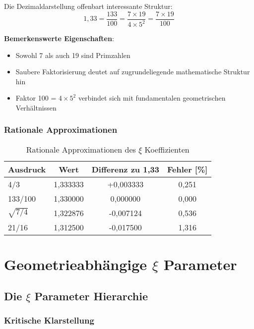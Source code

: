 \documentclass[12pt,a4paper]{article}
\newcommand{\mytimes}{\ensuremath{\times}}
\begin{document}
	Die Dezimaldarstellung offenbart interessante Struktur:
	\begin{equation}
		1,33 = \frac{133}{100} = \frac{7 \mytimes 19}{4 \mytimes 5^2} = \frac{7 \mytimes 19}{100}
		\label{eq:faktorisierung}
	\end{equation}
	
	\textbf{Bemerkenswerte Eigenschaften}:
	\begin{itemize}
		\item Sowohl 7 als auch 19 sind Primzahlen
		\item Saubere Faktorisierung deutet auf zugrundeliegende mathematische Struktur hin
		\item Faktor 100 = $4 \mytimes 5^2$ verbindet sich mit fundamentalen geometrischen Verhältnissen
	\end{itemize}
	
	\subsubsection{Rationale Approximationen}
	\label{subsubsec:rationale_approximationen}
	
	\begin{table}[htbp]
		\centering
		\begin{tabular}{lccc}
			\toprule
			\textbf{Ausdruck} & \textbf{Wert} & \textbf{Differenz zu 1,33} & \textbf{Fehler [\%]} \\
			\midrule
			4/3 & 1,333333 & +0,003333 & 0,251 \\
			133/100 & 1,330000 & 0,000000 & 0,000 \\
			$\sqrt{7/4}$ & 1,322876 & -0,007124 & 0,536 \\
			21/16 & 1,312500 & -0,017500 & 1,316 \\
			\bottomrule
		\end{tabular}
		\caption{Rationale Approximationen des $\xi$ Koeffizienten}
		\label{tab:rationale_approximationen}
	\end{table}
	\section{Geometrieabhängige $\xi$ Parameter}
	\label{sec:geometrieabhaengige_xi}
	
	\subsection{Die $\xi$ Parameter Hierarchie}
	\label{subsec:xi_hierarchie}
	
	\subsubsection{Kritische Klarstellung}
	\label{subsubsec:kritische_klarstellung}
	
\end{document}

